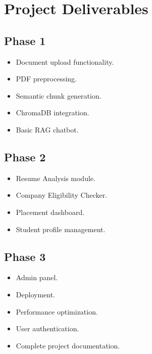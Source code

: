 \documentclass[11pt]{article}
\begin{document}
\section{Project Deliverables}

\subsection{Phase 1}

\begin{itemize}

\item Document upload functionality.

\item PDF preprocessing.

\item Semantic chunk generation.

\item ChromaDB integration.

\item Basic RAG chatbot.

\end{itemize}

\subsection{Phase 2}

\begin{itemize}

\item Resume Analysis module.

\item Company Eligibility Checker.

\item Placement dashboard.

\item Student profile management.

\end{itemize}

\subsection{Phase 3}

\begin{itemize}

\item Admin panel.

\item Deployment.

\item Performance optimization.

\item User authentication.

\item Complete project documentation.

\end{itemize}
\end{document}
